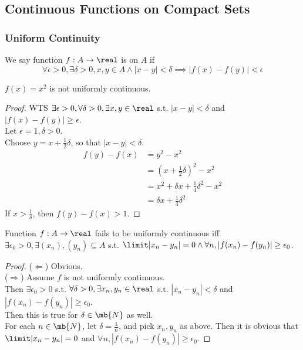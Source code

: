 \documentclass[11pt]{article}
\begin{document}
\subsection{Continuous Functions on Compact Sets}
\subsubsection{Uniform Continuity}
We say function $f: A \rightarrow \real$ is  on $A$ if 
$$\forall \epsilon > 0, \exists \delta > 0, x, y \in A \land |x - y| < \delta \implies |f(x) - f(y)| < \epsilon$$

\example $f(x) = x^2$ is not uniformly continuous.
\begin{proof}
	WTS $\exists \epsilon > 0, \forall \delta > 0, \exists x, y \in \real$ s.t. $|x - y| < \delta $ and $|f(x) - f(y)|  \geq \epsilon$.\\
	Let $\epsilon = 1, \delta > 0$. \\
	Choose $y = x + \frac{1}{2}\delta$, so that $|x - y| < \delta$. \\
	\begin{align*}
		f(y) - f(x) &= y^2 - x^2 \\
		&= (x + \frac{1}{2}\delta)^2 - x^2 \\
		&= x^2 + \delta x + \frac{1}{4}\delta^2 - x^2 \\
		&= \delta x + \frac{1}{4}\delta^2
	\end{align*} 
	If $x > \frac{1}{\delta}$, then $f(y) - f(x) > 1$.
\end{proof}

\property[\label{fails to be uniformly continuous iff}]
Function  $f: A \rightarrow \real$ fails to be uniformly continuous iff 
$\exists \epsilon_0 > 0, \exists (x_n), (y_n) \subseteq A$ s.t. $\limit |x_n - y_n| = 0 \land \forall n, |f(x_n) - f(y_n)| \geq \epsilon_0$.
\begin{proof} 
($\Leftarrow$) Obvious.\\
($\Rightarrow$) Assume $f$ is not uniformly continuous. \\
Then $\exists \epsilon_0 > 0$ s.t. $\forall \delta > 0, \exists x_n, y_n \in \real$ s.t. $|x_n - y_n| < \delta$ and $|f(x_n) - f(y_n)| \geq \epsilon_0$.\\
Then this is true for $\delta \in \mb{N}$ as well. \\
For each $n \in \mb{N}$, let $\delta = \frac{1}{n}$, and pick $x_n, y_n$ as above. Then it is obvious that $\limit |x_n - y_n| = 0$ and $\forall n, |f(x_n) - f(y_n)| \geq \epsilon_0$.
\end{proof}
\end{document}
